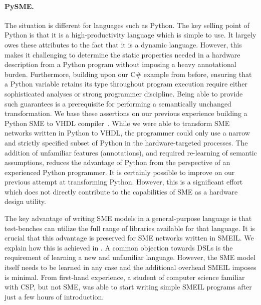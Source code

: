 \paragraph{PySME.}
The situation is different for languages such as Python. The key selling point
of Python is that it is a high-productivity language which is simple to use. It
largely owes these attributes to the fact that it is a dynamic
language. However, this makes it challenging to determine the static properties
needed in a hardware description from a Python program without imposing a heavy
annotational burden. Furthermore, building upon our C\# example from before,
ensuring that a Python variable retains its type throughout program execution
require either sophisticated analyses or strong programmer discipline. Being
able to provide such guarantees is a prerequisite for performing a semantically
unchanged transformation. We base these assertions on our previous experience
building a Python SME to VHDL compiler~\cite{asheim2016vhdl}. While we were able
to transform SME networks written in Python to VHDL, the programmer could only
use a narrow and strictly specified subset of Python in the hardware-targeted
processes. The addition of unfamiliar features (annotations), and required
re-learning of semantic assumptions, reduces the advantage of Python from the
perspective of an experienced Python programmer. It is certainly possible to
improve on our previous attempt at transforming Python. However, this is a
significant effort which does not directly contribute to the capabilities of SME
as a hardware design utility.


\vspace{1em} The key advantage of writing SME models in a general-purpose
language is that test-benches can utilize the full range of libraries available
for that language. It is crucial that this advantage is preserved for SME
networks written in SMEIL. We explain how this is achieved in 
. A common objection towards DSLs is the requirement of learning a new and
unfamiliar language. However, the SME model itself needs to be learned in any
case and the additional overhead SMEIL imposes is minimal. From first-hand
experience, a student of computer science familiar with CSP, but not SME, was
able to start writing simple SMEIL programs after just a few hours of
introduction.

